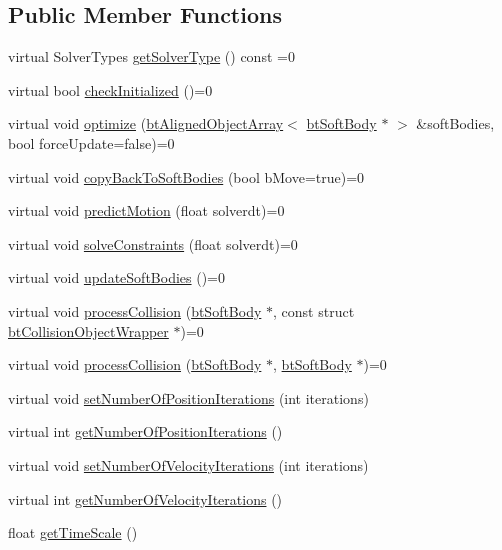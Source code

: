 \subsection*{Public Member Functions}
\begin{DoxyCompactItemize}
\item 
virtual Solver\+Types \hyperlink{classbtSoftBodySolver_aa08308ddb8e4661ab3c3e23cf3da647c}{get\+Solver\+Type} () const =0
\item 
virtual bool \hyperlink{classbtSoftBodySolver_aae0adf7ffc11cd7fafec927a54c654d5}{check\+Initialized} ()=0
\item 
virtual void \hyperlink{classbtSoftBodySolver_af07da1ec6f11e7873bc5fafef426fcd3}{optimize} (\hyperlink{classbtAlignedObjectArray}{bt\+Aligned\+Object\+Array}$<$ \hyperlink{classbtSoftBody}{bt\+Soft\+Body} $\ast$ $>$ \&soft\+Bodies, bool force\+Update=false)=0
\item 
virtual void \hyperlink{classbtSoftBodySolver_ac4034ba178cb75bd880a44958eaa38d1}{copy\+Back\+To\+Soft\+Bodies} (bool b\+Move=true)=0
\item 
virtual void \hyperlink{classbtSoftBodySolver_a72f0c095ae30002a6f98fc194a63e1ba}{predict\+Motion} (float solverdt)=0
\item 
virtual void \hyperlink{classbtSoftBodySolver_a5e71a2a32786574bedf409ba822980eb}{solve\+Constraints} (float solverdt)=0
\item 
virtual void \hyperlink{classbtSoftBodySolver_adac4b4f20eee46dc4fab26ed25be89ef}{update\+Soft\+Bodies} ()=0
\item 
virtual void \hyperlink{classbtSoftBodySolver_a7dea7c2ce8ad4e8cae29219ffeebe18d}{process\+Collision} (\hyperlink{classbtSoftBody}{bt\+Soft\+Body} $\ast$, const struct \hyperlink{structbtCollisionObjectWrapper}{bt\+Collision\+Object\+Wrapper} $\ast$)=0
\item 
virtual void \hyperlink{classbtSoftBodySolver_a08f03a574f0936d834ff100f87755ea6}{process\+Collision} (\hyperlink{classbtSoftBody}{bt\+Soft\+Body} $\ast$, \hyperlink{classbtSoftBody}{bt\+Soft\+Body} $\ast$)=0
\item 
virtual void \hyperlink{classbtSoftBodySolver_a80ffccfd244c51b2843991989a4191c9}{set\+Number\+Of\+Position\+Iterations} (int iterations)
\item 
virtual int \hyperlink{classbtSoftBodySolver_a814e9da6744f13f47613903e6fee5587}{get\+Number\+Of\+Position\+Iterations} ()
\item 
virtual void \hyperlink{classbtSoftBodySolver_a48b281048407640c73bfd355125a55e5}{set\+Number\+Of\+Velocity\+Iterations} (int iterations)
\item 
virtual int \hyperlink{classbtSoftBodySolver_a19a6754913540e92a387ffa5dbb2d29c}{get\+Number\+Of\+Velocity\+Iterations} ()
\item 
float \hyperlink{classbtSoftBodySolver_a6abd002edc15d4c80472fd4983679ea2}{get\+Time\+Scale} ()
\end{DoxyCompactItemize}
